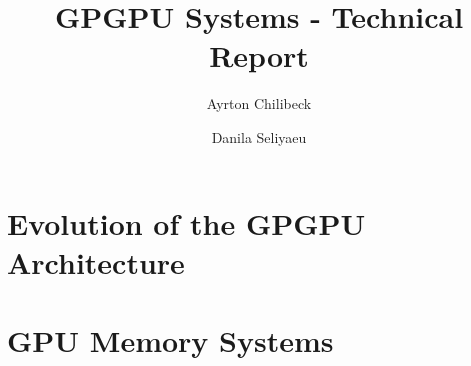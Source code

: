 



\title{GPGPU Systems - Technical Report}
\author[1]{Ayrton Chilibeck}
\author[1]{Danila Seliyaeu}



\maketitle

\vspace{2ex}

\tableofcontents

\part{Evolution of the GPGPU Architecture}







\part{GPU Memory Systems}






\printbibliography


